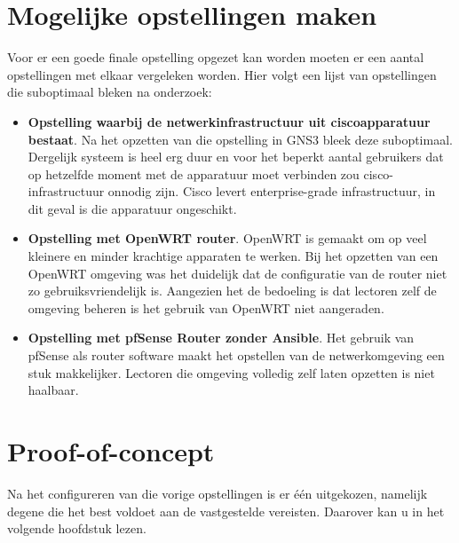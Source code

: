 \section{Mogelijke opstellingen maken}
Voor er een goede finale opstelling opgezet kan worden moeten er een aantal opstellingen met elkaar vergeleken worden. Hier volgt een lijst van opstellingen die suboptimaal bleken na onderzoek:
\begin{itemize}
	\item \textbf{Opstelling waarbij de netwerkinfrastructuur uit ciscoapparatuur bestaat}. Na het opzetten van die opstelling in GNS3 bleek deze suboptimaal. Dergelijk systeem is heel erg duur en voor het beperkt aantal gebruikers dat op hetzelfde moment met de apparatuur moet verbinden zou cisco-infrastructuur onnodig zijn. Cisco levert enterprise-grade infrastructuur, in dit geval is die apparatuur ongeschikt. 
	\item \textbf{Opstelling met OpenWRT router}. OpenWRT is gemaakt om op veel kleinere en minder krachtige apparaten te werken. Bij het opzetten van een OpenWRT omgeving was het duidelijk dat de configuratie van de router niet zo gebruiksvriendelijk is. Aangezien het de bedoeling is dat lectoren zelf de omgeving beheren is het gebruik van OpenWRT niet aangeraden. 
	\item \textbf{Opstelling met pfSense Router zonder Ansible}. Het gebruik van pfSense als router software maakt het opstellen van de netwerkomgeving een stuk makkelijker. Lectoren die omgeving volledig zelf laten opzetten is niet haalbaar.  
	 
\end{itemize} 

\section{Proof-of-concept}
Na het configureren van die vorige opstellingen is er \'{e}\'{e}n uitgekozen, namelijk degene die het best voldoet aan de vastgestelde vereisten. Daarover kan u in het volgende hoofdstuk lezen.
